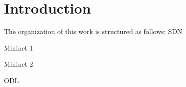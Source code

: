 \chapter{Introduction}\label{ch:introduction}

\bigskip
\bigskip
\bigskip
The organization of this work is structured as follows:
 \ac{SDN}


Mininet 1\cite{Mininet}

Mininet 2\cite{team2014mininet}

\cite{feamster2013road}

\cite{rowshanrad2016performance}

\cite{gomez2013openflow}

ODL \cite{odl}




